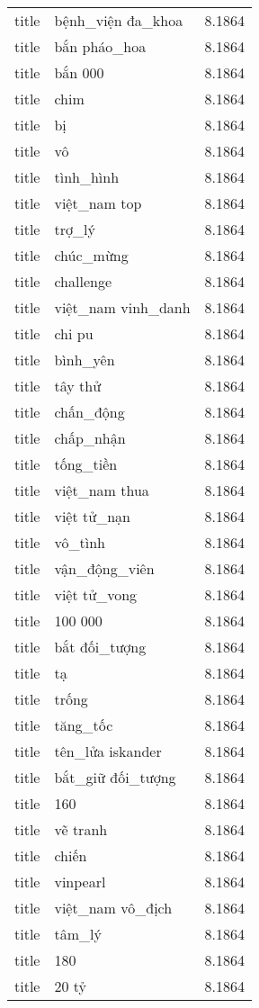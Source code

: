 \documentclass{article}
\begin{document}
\begin{tabular}{lll}
title & bệnh\_viện đa\_khoa & 8.1864\\
title & bắn pháo\_hoa & 8.1864\\
title & bắn 000 & 8.1864\\
title & chim & 8.1864\\
title & bị & 8.1864\\
title & vô & 8.1864\\
title & tình\_hình & 8.1864\\
title & việt\_nam top & 8.1864\\
title & trợ\_lý & 8.1864\\
title & chúc\_mừng & 8.1864\\
title & challenge & 8.1864\\
title & việt\_nam vinh\_danh & 8.1864\\
title & chi pu & 8.1864\\
title & bình\_yên & 8.1864\\
title & tây thử & 8.1864\\
title & chấn\_động & 8.1864\\
title & chấp\_nhận & 8.1864\\
title & tống\_tiền & 8.1864\\
title & việt\_nam thua & 8.1864\\
title & việt tử\_nạn & 8.1864\\
title & vô\_tình & 8.1864\\
title & vận\_động\_viên & 8.1864\\
title & việt tử\_vong & 8.1864\\
title & 100 000 & 8.1864\\
title & bắt đối\_tượng & 8.1864\\
title & tạ & 8.1864\\
title & trống & 8.1864\\
title & tăng\_tốc & 8.1864\\
title & tên\_lửa iskander & 8.1864\\
title & bắt\_giữ đối\_tượng & 8.1864\\
title & 160 & 8.1864\\
title & vẽ tranh & 8.1864\\
title & chiến & 8.1864\\
title & vinpearl & 8.1864\\
title & việt\_nam vô\_địch & 8.1864\\
title & tâm\_lý & 8.1864\\
title & 180 & 8.1864\\
title & 20 tỷ & 8.1864\\

\end{tabular}
\end{document}

